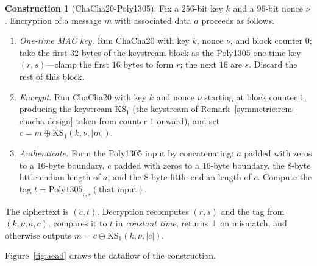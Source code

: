 \documentclass[11pt,a4paper]{article}
\theoremstyle{definition}
\newtheorem{construction}[theorem]{Construction}
\theoremstyle{remark}
\begin{document}
\begin{construction}[ChaCha20-Poly1305]\label{symmetric:def-chachapoly}
Fix a \(256\)-bit key \(k\) and a \(96\)-bit nonce \(\nu\).
Encryption of a message \(m\) with associated data \(a\) proceeds as
follows.
\begin{enumerate}
\item \emph{One-time MAC key.} Run \textsf{ChaCha20} with key \(k\),
  nonce \(\nu\), and block counter \(0\); take the first \(32\) bytes
  of the keystream block as the \textsf{Poly1305} one-time key
  \((r, s)\)---clamp the first \(16\) bytes to form \(r\); the next
  \(16\) are \(s\). Discard the rest of this block.
\item \emph{Encrypt.} Run \textsf{ChaCha20} with key \(k\) and nonce
  \(\nu\) starting at block counter \(1\), producing the keystream
  \(\mathrm{KS}_{1}\) (the keystream of
  Remark~\ref{symmetric:rem-chacha-design} taken from counter \(1\)
  onward), and set \(c = m \oplus \mathrm{KS}_{1}(k, \nu, |m|)\).
\item \emph{Authenticate.} Form the \textsf{Poly1305} input by
  concatenating: \(a\) padded with zeros to a \(16\)-byte boundary,
  \(c\) padded with zeros to a \(16\)-byte boundary, the \(8\)-byte
  little-endian length of \(a\), and the \(8\)-byte little-endian
  length of \(c\). Compute the tag
  \(t = \mathrm{Poly1305}_{r,s}(\text{that input})\).
\end{enumerate}
The ciphertext is \((c, t)\). Decryption recomputes \((r, s)\) and
the tag from \((k, \nu, a, c)\), compares it to \(t\) in
\emph{constant time}, returns \(\bot\) on mismatch, and otherwise
outputs \(m = c \oplus \mathrm{KS}_{1}(k, \nu, |c|)\).
\end{construction}

Figure~\ref{fig:aead} draws the dataflow of the construction.
\end{document}
